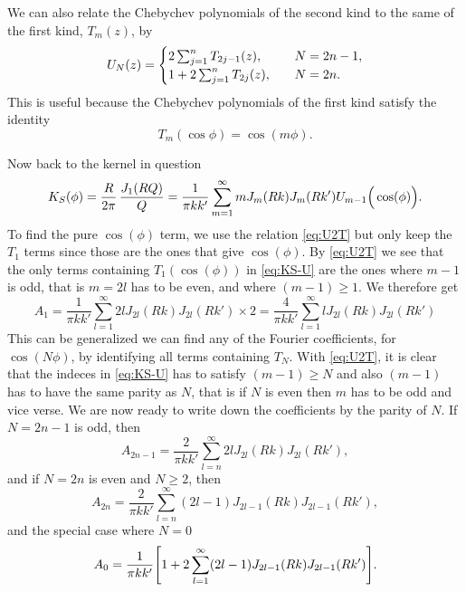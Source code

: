 \documentclass[11pt,a4paper, 
swedish, english %
]{article}
\begin{document}
We can also relate the Chebychev polynomials of the second kind to the
same of the first kind, $T_m(z)$, by
\begin{equation}\label{eq:U2T}
U_N(z) = 
\begin{cases}
2\sum_{j=1}^n T_{2j-1}(z)\qcomma&N=2n-1,\\
1+2\sum_{j=1}^n T_{2j}(z)\qcomma&N=2n.
\end{cases}
\end{equation}
This is useful because the Chebychev polynomials of the first kind
satisfy the identity \cite[chapter 18.4]{Arfken-Weber}
\begin{equation}\label{eq:Tcos}
T_m(\cos\phi) = \cos(m\phi).
\end{equation}

Now back to the kernel in question
\begin{equation}\label{eq:KS-U}
K_S(\phi) = \frac{R}{2\pi}\,\frac{J_1\qty(RQ)}{Q}
=\frac{1}{\pi kk'} \sum_{m=1}^\infty m
J_m(Rk)J_m(Rk') U_{m-1}\Big(\cos(\phi)\Big).
\end{equation}
To find the pure $\cos(\phi)$ term, we use the relation
\eqref{eq:U2T} but only keep the $T_1$ terms since those are the ones
that give $\cos(\phi)$. By \eqref{eq:U2T} we see that the
only terms containing $T_1(\cos(\phi))$ in \eqref{eq:KS-U} are
the ones where $m-1$ is odd, that is $m=2l$ has to be even, and where
$(m-1)\ge1$. We therefore get
\begin{equation}
A_1 = \frac{1}{\pi kk'} \sum_{l=1}^\infty 2l
J_{2l}(Rk)J_{2l}(Rk') \times2
=\frac{4}{\pi kk'} \sum_{l=1}^\infty l
J_{2l}(Rk)J_{2l}(Rk') 
\end{equation}
This can be generalized we can find any of the Fourier coefficients, for
$\cos(N\phi)$, by identifying all terms containing $T_N$. With
\eqref{eq:U2T}, it is clear that the indeces in \eqref{eq:KS-U} has to
satisfy $(m-1)\ge N$ and also $(m-1)$ has to have the same parity as
$N$, that is if $N$ is even then $m$ has to be odd and vice verse. We
are now ready to write down the coefficients by the parity of $N$. 
If $N=2n-1$ is odd, then
\begin{equation}
A_{2n-1} = \frac{2}{\pi kk'} 
\sum_{l=n}^\infty 2l J_{2l}(Rk)J_{2l}(Rk'),
\end{equation}
and if $N=2n$ is even and $N\ge2$, then
\begin{equation}
A_{2n} = \frac{2}{\pi kk'} 
\sum_{l=n}^\infty (2l-1) J_{2l-1}(Rk)J_{2l-1}(Rk'),
\end{equation}
and the special case where $N=0$
\begin{equation}
A_{0} = \frac{1}{\pi kk'} 
\qty[1+2\sum_{l=1}^\infty (2l-1) J_{2l-1}(Rk)J_{2l-1}(Rk')].
\end{equation}
\end{document}
